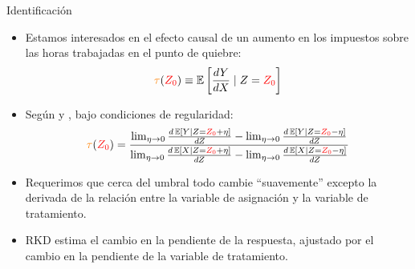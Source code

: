 \documentclass[10pt, xcolor=dvipsnames]{beamer}
\begin{document}
\begin{frame}{Identificación}
    \begin{itemize}
        \item Estamos interesados en el efecto causal de un aumento en los impuestos sobre las horas trabajadas en el punto de quiebre:
        \begin{align*}
            \textcolor{orange}{\tau}(\textcolor{red}{Z_0}) \equiv \operatorname{\mathbb{E}} \left[\frac{d Y}{d X}\mid Z=\textcolor{red}{Z_0}\right]    
        \end{align*}
        \item Según \citet{Nielsen2010} y \citet{Card2012a}, bajo condiciones de regularidad:
        \begin{align*}
            \textcolor{orange}{\tau}(\textcolor{red}{Z_0}) = \frac{\lim_{\eta\to 0} \frac{d \operatorname{\mathbb{E}}[Y \vert Z=\textcolor{red}{Z_0}+\eta]}{dZ} - \lim_{\eta\to 0} \frac{d \operatorname{\mathbb{E}}[Y \vert Z=\textcolor{red}{Z_0}-\eta]}{dZ}}{\lim_{\eta\to 0} \frac{d \operatorname{\mathbb{E}}[X \vert Z=\textcolor{red}{Z_0}+\eta]}{dZ} - \lim_{\eta\to 0} \frac{d \operatorname{\mathbb{E}}[X \vert Z=\textcolor{red}{Z_0}-\eta]}{dZ}}
        \end{align*}
    \item Requerimos que cerca del umbral todo cambie ``suavemente'' excepto la derivada de la relación entre la variable de asignación y la variable de tratamiento.
    \item RKD estima el cambio en la pendiente de la respuesta, ajustado por el cambio en la pendiente de la variable de tratamiento.
    \end{itemize}
\end{frame}
\end{document}
